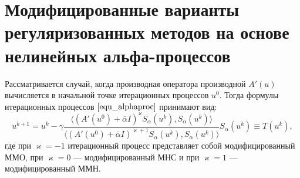 \section{Модифицированные варианты регуляризованных методов на основе нелинейных альфа-процессов}
Рассматривается случай, когда производная оператора производной $A'(u)$ вычисляется в начальной точке итерационных процессов $u^0$. Тогда формулы итерационных процессов $\eqref{equ_alphaproc}$ принимают вид:
\begin{equation}\label{modalphaproc}
u^{k+1}=u^k-\gamma\frac{\langle (A'(u^0)+\bar\alpha I)^{\varkappa}S_\alpha(u^k), S_\alpha(u^k)\rangle}{\langle (A'(u^0)+\bar\alpha I)^{\varkappa+1}S_\alpha(u^k), S_\alpha(u^k)\rangle}S_\alpha(u^k)\equiv T(u^k),
\end{equation}
где при $\varkappa=-1$ итерационный процесс представляет собой модифицированный ММО, при $\varkappa=0$ --- модифицированный МНС и при $\varkappa=1$ --- модифицированный ММН.

